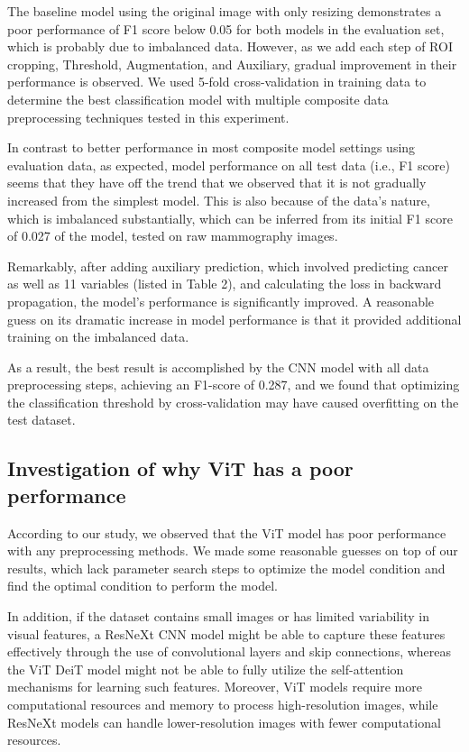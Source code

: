 \documentclass[11pt,letterpaper, twocolumn]{article}
\begin{document}
The baseline model using the original image with only resizing demonstrates a poor performance of F1 score below 0.05 for both models in the evaluation set, which is probably due to imbalanced data.  However, as we add each step of ROI cropping, Threshold, Augmentation, and Auxiliary, gradual improvement in their performance is observed. We used 5-fold cross-validation in training data to determine the best classification model with multiple composite data preprocessing techniques tested in this experiment. 

In contrast to better performance in most composite model settings using evaluation data, as expected, model performance on all test data (i.e., F1 score) seems that they have off the trend that we observed that it is not gradually increased from the simplest model. This is also because of the data's nature, which is imbalanced substantially, which can be inferred from its initial F1 score of 0.027 of the model, tested on raw mammography images.

Remarkably, after adding auxiliary prediction, which involved predicting cancer as well as 11 variables (listed in Table 2), and calculating the loss in backward propagation, the model's performance is significantly improved. A reasonable guess on its dramatic increase in model performance is that it provided additional training on the imbalanced data.

As a result, the best result is accomplished by the CNN model with all data preprocessing steps, achieving an F1-score of 0.287, and we found that optimizing the classification threshold by cross-validation may have caused overfitting on the test dataset.

\subsection{Investigation of why ViT has a poor performance}
According to our study, we observed that the ViT model has poor performance with any preprocessing methods. We made some reasonable guesses on top of our results, which lack parameter search steps to optimize the model condition and find the optimal condition to perform the model. 

In addition, if the dataset contains small images or has limited variability in visual features, a ResNeXt CNN model might be able to capture these features effectively through the use of convolutional layers and skip connections, whereas the ViT DeiT model might not be able to fully utilize the self-attention mechanisms for learning such features. Moreover, ViT models require more computational resources and memory to process high-resolution images, while ResNeXt models can handle lower-resolution images with fewer computational resources.
\end{document}
